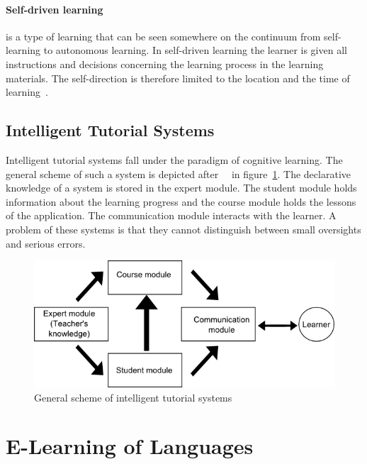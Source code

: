 \paragraph{Self-driven learning} is a type of learning that can be seen somewhere
on the continuum from self-learning to autonomous learning. In self-driven 
learning the learner is given all instructions and decisions concerning the
learning process in the learning materials. The self-direction is therefore 
limited to the location and the time of learning~.

\subsection{Intelligent Tutorial Systems}
\label{sec:elearn:intelligenttutorialsystems}

Intelligent tutorial systems fall under the paradigm of cognitive learning.
The general scheme of such a system is depicted after~~\citeyear{Richert2007} in 
figure~\ref{fig:tutorialsystems}. 
The declarative knowledge of a system is stored in the expert module. 
The student module holds information about the learning progress and the
course module holds the lessons of the application.
The communication module interacts with the learner.
A problem of these systems is that they cannot distinguish between
small oversights and serious errors.

\begin{figure}[htbp]
\begin{center}
\includegraphics[scale=0.5]{images/E-Learning/tutorialSystems.png}
\caption{General scheme of intelligent tutorial systems}
\label{fig:tutorialsystems}
\end{center}
\end{figure}

\section{E-Learning of Languages}
\label{sec:elearn:elearningoflanguages}


